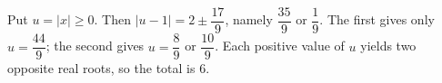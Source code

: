 Put $u=|x|\ge0$. Then $|u-1|=2\pm\dfrac{17}{9}$, namely $\dfrac{35}{9}$ or $\dfrac{1}{9}$. The first gives only $u=\dfrac{44}{9}$; the second gives $u=\dfrac{8}{9}$ or $\dfrac{10}{9}$. Each positive value of $u$ yields two opposite real roots, so the total is $\boxed6$.

